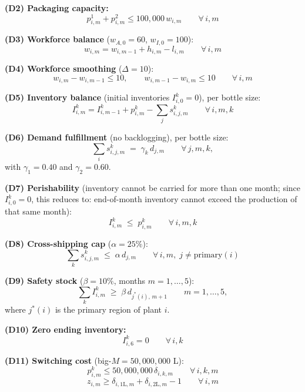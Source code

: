 \documentclass[12pt,a4paper]{article}
\begin{document}
\textbf{(D2) Packaging capacity:}
\[
  p^1_{i,m}+p^2_{i,m}\leq100{,}000\,w_{i,m} \qquad\forall\,i,m
\]

\textbf{(D3) Workforce balance} ($w_{A,0}=60$, $w_{I,0}=100$):
\[
  w_{i,m}=w_{i,m-1}+h_{i,m}-l_{i,m} \qquad\forall\,i,m
\]

\textbf{(D4) Workforce smoothing} ($\Delta=10$):
\[
  w_{i,m}-w_{i,m-1}\leq10, \qquad w_{i,m-1}-w_{i,m}\leq10 \qquad\forall\,i,m
\]

\textbf{(D5) Inventory balance} (initial inventories $I^{k}_{i,0}=0$), per bottle size:
\[
  I^{k}_{i,m}=I^{k}_{i,m-1}+p^{k}_{i,m}-\sum_{j}s^{k}_{i,j,m}
  \qquad\forall\,i,m,k
\]

\textbf{(D6) Demand fulfillment} (no backlogging), per bottle size:
\[
  \sum_{i}s^{k}_{i,j,m}\;=\;\gamma_k\,d_{j,m}
  \qquad\forall\,j,m,k,
\]
with $\gamma_1=0.40$ and $\gamma_2=0.60$.

\textbf{(D7) Perishability} (inventory cannot be carried for more than one month;
since $I^{k}_{i,0}=0$, this reduces to: end-of-month inventory cannot exceed the
production of that same month):
\[
  I^{k}_{i,m}\;\leq\;p^{k}_{i,m} \qquad\forall\,i,m,k
\]

\textbf{(D8) Cross-shipping cap} ($\alpha=25\%$):
\[
  \sum_{k}s^{k}_{i,j,m}\;\leq\;\alpha\,d_{j,m}
  \qquad\forall\,i,m,\;j\neq\mathrm{primary}(i)
\]

\textbf{(D9) Safety stock} ($\beta=10\%$, months $m=1,\ldots,5$):
\[
  \sum_{k}I^{k}_{i,m}\;\geq\;\beta\,d_{j^*(i),\,m+1}
  \qquad m=1,\ldots,5,
\]
where $j^*(i)$ is the primary region of plant $i$.

\textbf{(D10) Zero ending inventory:}
\[
  I^{k}_{i,6}=0 \qquad\forall\,i,k
\]

\textbf{(D11) Switching cost} (big-$M=50{,}000{,}000$ L):
\[
  p^k_{i,m}\leq50{,}000{,}000\,\delta_{i,k,m} \qquad\forall\,i,k,m
\]
\[
  z_{i,m}\geq\delta_{i,1\mathrm{L},m}+\delta_{i,2\mathrm{L},m}-1 \qquad\forall\,i,m
\]
\end{document}
